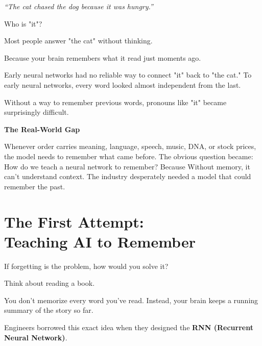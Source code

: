 \documentclass[11pt]{article}
\begin{document}
\vspace{0.2in}
\begin{center}
{\fontsize{20}{24}\selectfont\color{brandnavy}\textit{``The cat chased the dog because it was hungry.''}}
\end{center}
\vspace{0.2in}

Who is "it"?

Most people answer "the cat" without thinking. 

Because your brain remembers what it read just moments ago.

Early neural networks had no reliable way to connect "it" back to "the cat." To early neural networks, every word looked almost independent from the last.

Without a way to remember previous words, pronouns like "it" became surprisingly difficult.

\vspace{0.15in}

\begin{darkbox}
{\large\textbf{The Real-World Gap}}


Whenever order carries meaning, language, speech, music, DNA, or stock prices, the model needs to remember what came before. The obvious question became:
How do we teach a neural network to remember?
Because Without memory, it can't understand context. The industry desperately needed a model that could remember the past.

\end{darkbox}

\vfill
\newpage

\section*{The First Attempt:\\Teaching AI to Remember}

\vspace{0.15in}

If forgetting is the problem, how would you solve it?

Think about reading a book.

You don't memorize every word you've read. Instead, your brain keeps a running summary of the story so far.

Engineers borrowed this exact idea when they designed the \textbf{RNN (Recurrent Neural Network)}. 
\end{document}
